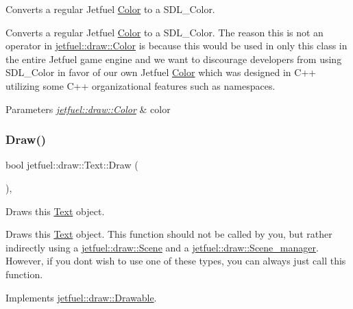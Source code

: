 Converts a regular Jetfuel \hyperlink{classjetfuel_1_1draw_1_1Color}{Color} to a S\+D\+L\+\_\+\+Color. 

Converts a regular Jetfuel \hyperlink{classjetfuel_1_1draw_1_1Color}{Color} to a S\+D\+L\+\_\+\+Color. The reason this is not an operator in \hyperlink{classjetfuel_1_1draw_1_1Color}{jetfuel\+::draw\+::\+Color} is because this would be used in only this class in the entire Jetfuel game engine and we want to discourage developers from using S\+D\+L\+\_\+\+Color in favor of our own Jetfuel \hyperlink{classjetfuel_1_1draw_1_1Color}{Color} which was designed in C++ utilizing some C++ organizational features such as namespaces.


\begin{DoxyParams}{Parameters}
{\em \hyperlink{classjetfuel_1_1draw_1_1Color}{jetfuel\+::draw\+::\+Color}} & color \\
\hline
\end{DoxyParams}
\mbox{\label{classjetfuel_1_1draw_1_1Text_ac0b8a614277d6b575c52d127e9a673f2}} 
\subsubsection{\texorpdfstring{Draw()}{Draw()}}
{\footnotesize\ttfamily bool jetfuel\+::draw\+::\+Text\+::\+Draw (\begin{DoxyParamCaption}{ }\end{DoxyParamCaption})\hspace{0.3cm}{\ttfamily [override]}, {\ttfamily [virtual]}}



Draws this \hyperlink{classjetfuel_1_1draw_1_1Text}{Text} object. 

Draws this \hyperlink{classjetfuel_1_1draw_1_1Text}{Text} object. This function should not be called by you, but rather indirectly using a \hyperlink{classjetfuel_1_1draw_1_1Scene}{jetfuel\+::draw\+::\+Scene} and a \hyperlink{classjetfuel_1_1draw_1_1Scene__manager}{jetfuel\+::draw\+::\+Scene\+\_\+manager}. However, if you don\textquotesingle{}t wish to use one of these types, you can always just call this function. 

Implements \hyperlink{classjetfuel_1_1draw_1_1Drawable_a1a072070322965ce9411ee6e7c311c56}{jetfuel\+::draw\+::\+Drawable}.

